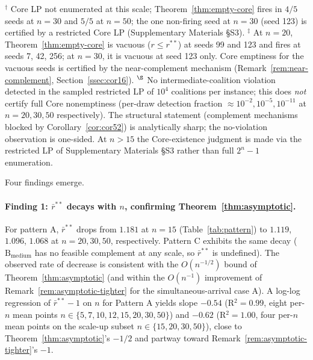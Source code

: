 \documentclass[11pt]{article}
\theoremstyle{plain}
\theoremstyle{definition}
\theoremstyle{remark}
\begin{document}
\begin{table}[t]
{\footnotesize $^{\dagger}$ Core LP not enumerated at this scale; Theorem~\ref{thm:empty-core} fires in $4/5$ seeds at $n=30$ and $5/5$ at $n=50$; the one non-firing seed at $n=30$ (seed 123) is certified by a restricted Core LP (Supplementary Materials \S S3). $^{\ddagger}$ At $n=20$, Theorem~\ref{thm:empty-core} is vacuous ($r\le r^{\ast\ast}$) at seeds 99 and 123 and fires at seeds 7, 42, 256; at $n=30$, it is vacuous at seed 123 only. Core emptiness for the vacuous seeds is certified by the near-complement mechanism (Remark~\ref{rem:near-complement}, Section~\ref{ssec:cor16}). $^{\S}$ No intermediate-coalition violation detected in the sampled restricted LP of $10^{4}$ coalitions per instance; this does \emph{not} certify full Core nonemptiness (per-draw detection fraction $\approx 10^{-2}, 10^{-5}, 10^{-11}$ at $n=20, 30, 50$ respectively). The structural statement (complement mechanisms blocked by Corollary~\ref{cor:cor52}) is analytically sharp; the no-violation observation is one-sided. At $n>15$ the Core-existence judgment is made via the restricted LP of Supplementary Materials \S S3 rather than full $2^n-1$ enumeration.}
\end{table}

Four findings emerge.

\paragraph{Finding 1: $\bar r^{\ast\ast}$ decays with $n$, confirming Theorem~\ref{thm:asymptotic}.} For pattern A, $\bar r^{\ast\ast}$ drops from $1.181$ at $n=15$ (Table~\ref{tab:pattern}) to $1.119$, $1.096$, $1.068$ at $n=20, 30, 50$, respectively. Pattern C exhibits the same decay ($\text{B}_{\text{medium}}$ has no feasible complement at any scale, so $\bar r^{\ast\ast}$ is undefined). The observed rate of decrease is consistent with the $O(n^{-1/2})$ bound of Theorem~\ref{thm:asymptotic} (and within the $O(n^{-1})$ improvement of Remark~\ref{rem:asymptotic-tighter} for the simultaneous-arrival case A). A log-log regression of $\bar r^{\ast\ast}-1$ on $n$ for Pattern A yields slope $-0.54$ (R$^2=0.99$, eight per-$n$ mean points $n\in\{5,7,10,12,15,20,30,50\}$) and $-0.62$ (R$^2=1.00$, four per-$n$ mean points on the scale-up subset $n\in\{15,20,30,50\}$), close to Theorem~\ref{thm:asymptotic}'s $-1/2$ and partway toward Remark~\ref{rem:asymptotic-tighter}'s $-1$.
\end{document}
